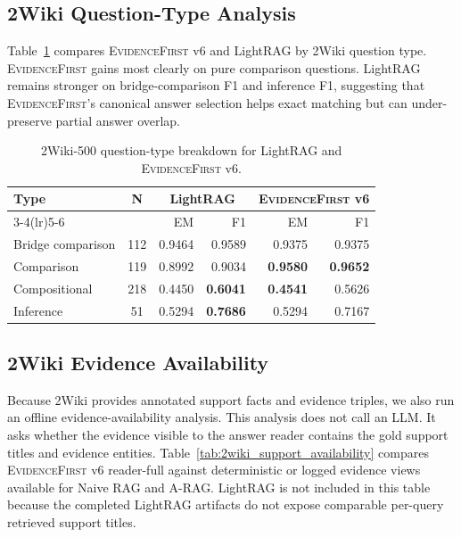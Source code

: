 \documentclass[runningheads]{llncs}
\newcommand{\sys}{\textsc{EvidenceFirst}\xspace}
\begin{document}
\subsection{2Wiki Question-Type Analysis}

Table~\ref{tab:2wiki_types} compares \sys v6 and LightRAG by 2Wiki question
type. \sys gains most clearly on pure comparison questions. LightRAG remains
stronger on bridge-comparison F1 and inference F1, suggesting that \sys's
canonical answer selection helps exact matching but can under-preserve partial
answer overlap.

\begin{table}[t]
\centering
\caption{2Wiki-500 question-type breakdown for LightRAG and \sys v6.}
\label{tab:2wiki_types}
\small
\begin{tabular}{lcrrrr}
\toprule
Type & N & \multicolumn{2}{c}{LightRAG} & \multicolumn{2}{c}{\sys v6} \\
\cmidrule(lr){3-4}\cmidrule(lr){5-6}
 & & EM & F1 & EM & F1 \\
\midrule
Bridge comparison & 112 & 0.9464 & 0.9589 & 0.9375 & 0.9375 \\
Comparison & 119 & 0.8992 & 0.9034 & \textbf{0.9580} & \textbf{0.9652} \\
Compositional & 218 & 0.4450 & \textbf{0.6041} & \textbf{0.4541} & 0.5626 \\
Inference & 51 & 0.5294 & \textbf{0.7686} & 0.5294 & 0.7167 \\
\bottomrule
\end{tabular}
\end{table}

\subsection{2Wiki Evidence Availability}

Because 2Wiki provides annotated support facts and evidence triples, we also run
an offline evidence-availability analysis. This analysis does not call an LLM.
It asks whether the evidence visible to the answer reader contains the gold
support titles and evidence entities. Table~\ref{tab:2wiki_support_availability}
compares \sys v6 reader-full against deterministic or logged evidence views
available for Naive RAG and A-RAG. LightRAG is not included in this table because
the completed LightRAG artifacts do not expose comparable per-query retrieved
support titles.
\end{document}

